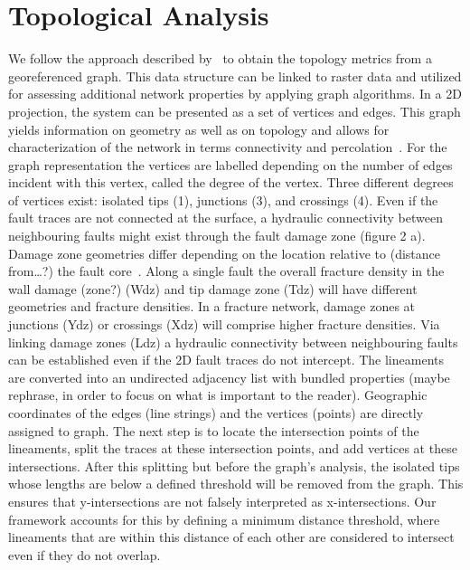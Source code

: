 \documentclass[a4paper,fleqn]{cas-sc}
\begin{document}
\section{Topological Analysis}
We follow the approach described by~\cite{Sanderson2018, Sanderson2019} to obtain the topology metrics from a georeferenced graph. This data structure can be linked to raster data and utilized for assessing additional network properties by applying graph algorithms. In a 2D projection, the system can be presented as a set of vertices and edges. This graph yields information on geometry as well as on topology and allows for characterization of the network in terms connectivity and percolation~\citep{Manzocchi2002, Nixon2013, Sanderson2015, Sanderson2018}. For the graph representation the vertices are labelled depending on the number of edges incident with this vertex, called the degree of the vertex. Three different degrees of vertices exist: isolated tips (1), junctions (3), and crossings (4). Even if the fault traces are not connected at the surface, a hydraulic connectivity between neighbouring faults might exist through the fault damage zone (figure 2 a). Damage zone geometries differ depending on the location relative to (distance from…?) the fault core~\citep{Peacock2017}. Along a single fault the overall fracture density in the wall damage (zone?) (Wdz) and tip damage zone (Tdz) will have different geometries and fracture densities. In a fracture network, damage zones at junctions (Ydz) or crossings (Xdz) will comprise higher fracture densities. Via linking damage zones (Ldz) a hydraulic connectivity between neighbouring faults can be established even if the 2D fault traces do not intercept. 
The lineaments are converted into an undirected adjacency list with bundled properties (maybe rephrase, in order to focus on what is important to the reader).  Geographic coordinates of the edges (line strings) and the vertices (points) are directly assigned to graph. The next step is to locate the intersection points of the lineaments, split the traces at these intersection points, and add vertices at these intersections. After this splitting but before the graph’s analysis, the isolated tips whose lengths are below a defined threshold will be removed from the graph. This ensures that y-intersections are not falsely interpreted as x-intersections. Our framework accounts for this by defining a minimum distance threshold, where lineaments that are within this distance of each other are considered to intersect even if they do not overlap.
\end{document}
